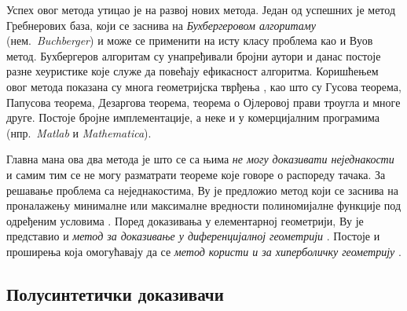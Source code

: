 Успех овог метода утицао је на развој нових метода. Један од успешних
је метод Гребнерових база, који се заснива на \emph{Бухбергеровом
  алгоритаму} (нем.~\emph{Buchberger}) \cite{buchberger} и може се
применити на исту класу проблема као и Вуов метод. Бухбергеров
алгоритам су унапређивали бројни аутори и данас постоје разне
хеуристике које служе да повећају ефикасност алгоритма. Коришћењем
овог метода показана су многа геометријска тврђења
\cite{buchberger1998grobner}, као што су Гусова теорема, Папусова
теорема, Дезаргова теорема, теорема о Ојлеровој прави троугла и многе
друге. Постоје бројне имплементације, а неке и у комерцијалним
програмима (нпр.~\emph{Matlab} и \emph{Mathematica}).

Главна мана ова два метода је што се са њима \emph{не могу доказивати
  неједнакости} и самим тим се не могу разматрати теореме које говоре
о распореду тачака. За решавање проблема са неједнакостима, Ву је
предложио метод који се заснива на проналажењу минималне или
максималне вредности полиномијалне функције под одређеним условима
\cite{Wu1992}. Поред доказивања у елементарној геометрији, Ву је
представио и \emph{метод за доказивање у диференцијалној геометрији}
\cite{wen1991mechanical}. Постоје и проширења која омогућавају да се
\emph{метод користи и за хиперболичку геометрију}
\cite{yang1998automated}.

\subsection{Полусинтетички доказивачи}

